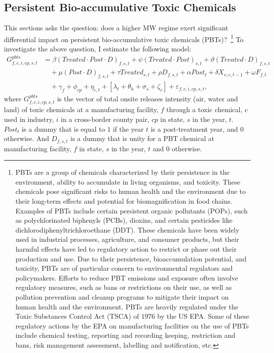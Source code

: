 \documentclass[12pt, english]{article}
\begin{document}
    \subsection{Persistent Bio-accumulative Toxic Chemicals}\label{subsec:persistent-bioaccumulative-toxic-chemicals}
    This sections asks the question: does a higher MW regime exert significant differential impact on persistent bio-accumulative toxic chemicals (PBTs)?~\footnote{\tiny PBTs are a group of chemicals characterized by their persistence in the environment, ability to accumulate in living organisms, and toxicity. These chemicals pose significant risks to human health and the environment due to their long-term effects and potential for biomagnification in food chains. Examples of PBTs include certain persistent organic pollutants (POPs), such as polychlorinated biphenyls (PCBs), dioxins, and certain pesticides like dichlorodiphenyltrichloroethane (DDT). These chemicals have been widely used in industrial processes, agriculture, and consumer products, but their harmful effects have led to regulatory action to restrict or phase out their production and use. Due to their persistence, bioaccumulation potential, and toxicity, PBTs are of particular concern to environmental regulators and policymakers. Efforts to reduce PBT emissions and exposure often involve regulatory measures, such as bans or restrictions on their use, as well as pollution prevention and cleanup programs to mitigate their impact on human health and the environment. PBTs are heavily regulated under the Toxic Substances Control Act (TSCA) of $1976$ by the US EPA. Some of these regulatory actions by the EPA on manufacturing facilities on the use of PBTs include chemical testing, reporting and recording keeping, restriction and bans, risk management assessment, labelling and notification, etc.} To investigate the above question, I estimate the following model:
    \begin{align}
        G_{f,c,i,cp,s,t}^{pbts} &= \beta (Treated \cdot Post \cdot D)_{f,s,t} + \psi (Treated \cdot Post)_{s,t} + \vartheta (Treated \cdot D)_{f,s,t} \nonumber \\
        &\quad + \mu (Post \cdot D)_{f,s,t} + \tau Treated_{s,t} + \rho D_{f,s,t} + \alpha Post_{t} + \delta X_{v,c,t-1} + \omega F_{f,t} \nonumber \\
        &\quad + \gamma_{f} + \phi_{cp} + \eta_{c,t} + \left[\lambda_{t} + \theta_{h} + \sigma_{s} + \zeta_{c} \right] + \varepsilon_{f,c,i,cp,s,t},\label{eq:heterogeneous-onsite-releases-intensity-pbts}
    \end{align}
    where $G_{f,c,i,cp,s,t}^{pbts}$ is the vector of total onsite releases intensity (air, water and land) of toxic chemicals at a manufacturing facility, $f$ through a toxic chemical, $c$ used in industry, $i$ in a cross-border county pair, $cp$ in state, $s$ in the year, $t$. $Post_{t}$ is a dummy that is equal to $1$ if the year $t$ is a post-treatment year, and $0$ otherwise. And $D_{f,s,t}$ is a dummy that is unity for a PBT chemical at manufacturing facility, $f$ in state, $s$ in the year, $t$ and $0$ otherwise.
    
\end{document}
